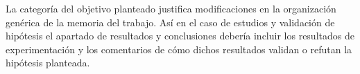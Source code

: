 La categoría del objetivo planteado justifica modificaciones en la organización genérica de la memoria del trabajo. Así en el caso de estudios y validación de hipótesis el apartado de resultados y conclusiones debería incluir los resultados de experimentación y los comentarios de cómo dichos resultados validan o refutan la hipótesis planteada.


